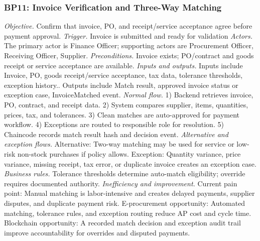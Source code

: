 \documentclass[conference]{IEEEtran}
\begin{document}
\subsubsection{BP11: Invoice Verification and Three-Way Matching}
\textit{Objective.} Confirm that invoice, PO, and receipt/service acceptance agree before payment approval.
\textit{Trigger.} Invoice is submitted and ready for validation
\textit{Actors.} The primary actor is Finance Officer; supporting actors are Procurement Officer, Receiving Officer, Supplier.
\textit{Preconditions.} Invoice exists; PO/contract and goods receipt or service acceptance are available.
\textit{Inputs and outputs.} Inputs include Invoice, PO, goods receipt/service acceptance, tax data, tolerance thresholds, exception history.. Outputs include Match result, approved invoice status or exception case, InvoiceMatched event.
\textit{Normal flow.} 1) Backend retrieves invoice, PO, contract, and receipt data. 2) System compares supplier, items, quantities, prices, tax, and tolerances. 3) Clean matches are auto-approved for payment workflow. 4) Exceptions are routed to responsible role for resolution. 5) Chaincode records match result hash and decision event.
\textit{Alternative and exception flows.} Alternative: Two-way matching may be used for service or low-risk non-stock purchases if policy allows. Exception: Quantity variance, price variance, missing receipt, tax error, or duplicate invoice creates an exception case.
\textit{Business rules.} Tolerance thresholds determine auto-match eligibility; override requires documented authority.
\textit{Inefficiency and improvement.} Current pain point: Manual matching is labor-intensive and creates delayed payments, supplier disputes, and duplicate payment risk. E-procurement opportunity: Automated matching, tolerance rules, and exception routing reduce AP cost and cycle time. Blockchain opportunity: A recorded match decision and exception audit trail improve accountability for overrides and disputed payments.
\end{document}
